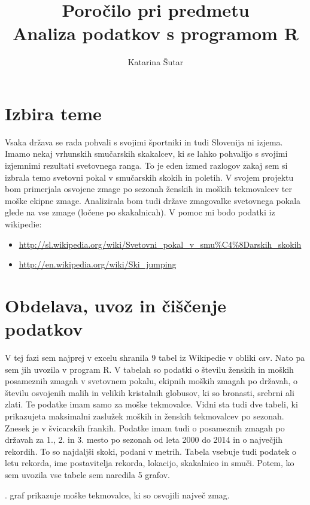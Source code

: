 \documentclass[11pt,a4paper]{article}
\begin{document}
\title{Poročilo pri predmetu \\
Analiza podatkov s programom R}
\author{Katarina Šutar}
\maketitle

\section{Izbira teme}

Vsaka država se rada pohvali s svojimi športniki in tudi Slovenija ni izjema. Imamo nekaj vrhunskih smučarskih skakalcev, ki se lahko pohvalijo s svojimi izjemnimi rezultati svetovnega ranga. To je eden izmed razlogov zakaj sem si izbrala temo svetovni pokal v smučarskih skokih in poletih. V svojem projektu bom primerjala osvojene zmage po sezonah ženskih in moških tekmovalcev ter moške ekipne zmage. Analizirala bom tudi države zmagovalke svetovnega pokala glede na vse zmage (ločene po skakalnicah). V pomoc mi bodo podatki iz wikipedie:
\begin{itemize}
\item \url{http://sl.wikipedia.org/wiki/Svetovni_pokal_v_smu%C4%8Darskih_skokih}
\item \url{http://en.wikipedia.org/wiki/Ski_jumping}
\end{itemize}


\section{Obdelava, uvoz in čiščenje podatkov}

V tej fazi sem najprej v excelu shranila 9 tabel iz Wikipedie v obliki csv. Nato pa sem jih uvozila v program R. V tabelah so podatki o številu ženskih in moških posameznih zmagah v svetovnem pokalu, ekipnih moških zmagah po državah, o številu osvojenih malih in velikih kristalnih globusov, ki so bronasti, srebrni ali zlati. Te podatke imam samo za moške tekmovalce. Vidni sta tudi dve tabeli, ki prikazujeta maksimalni zaslužek moških in ženskih tekmovalcev po sezonah. Znesek je v švicarskih frankih. Podatke imam tudi o posameznih zmagah po državah za 1., 2. in 3. mesto po sezonah od leta 2000 do 2014 in o največjih rekordih. To so najdaljši skoki, podani v metrih. Tabela vsebuje tudi podatek o letu rekorda, ime postavitelja rekorda, lokacijo, skakalnico in smuči. Potem, ko sem uvozila vse tabele sem naredila 5 grafov. 

. graf prikazuje moške tekmovalce, ki so osvojili največ zmag.
\end{document}
